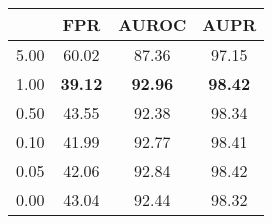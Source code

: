 \documentclass{article}
\begin{document}
\begin{table}[t]
{{\vspace{5pt}
{
\begin{tabular}{c|ccc}
\toprule[1.5pt]
            & FPR      & AUROC        & AUPR       \\
\midrule[0.6pt]
5.00               & 60.02                  & 87.36                  & 97.15       \\
\cellcolor{greyC}1.00               & \cellcolor{greyC}\textbf{39.12}                  & \cellcolor{greyC}\textbf{92.96}                  & \cellcolor{greyC}\textbf{98.42}       \\
0.50               & 43.55                  & 92.38                  & 98.34       \\ 
0.10               & 41.99                  & 92.77                  & 98.41       \\
0.05               & 42.06                  & 92.84                  & 98.42       \\ 
0.00               & 43.04                  & 92.44                  & 98.32       \\
\bottomrule[1.5pt]      
\end{tabular}
}
}}
\end{table}













 
\end{document}
